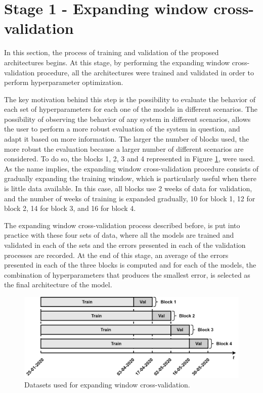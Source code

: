 \section{Stage 1 - Expanding window cross-validation}\label{chap3:section:stage_1}

In this section, the process of training and validation of the proposed architectures begins. At this stage, by performing the expanding window cross-validation procedure, all the architectures were trained and validated in order to perform hyperparameter optimization. 

The key motivation behind this step is the possibility to evaluate the behavior of each set of hyperparameters for each one of the models in different scenarios. The possibility of observing the behavior of any system in different scenarios, allows the user to perform a more robust evaluation of the system in question, and adapt it based on more information. The larger the number of blocks used, the more robust the evaluation because a larger number of different scenarios are considered. To do so, the blocks 1, 2, 3 and 4 represented in Figure \ref{hyptun}, were used. As the name implies, the expanding window cross-validation procedure consists of gradually expanding the training window, which is particularly useful when there is little data available. In this case, all blocks use 2 weeks of data for validation, and the number of weeks of training is expanded gradually, 10 for block 1, 12 for block 2, 14 for block 3, and 16 for block 4.

The expanding window cross-validation process described before, is put into practice with these four sets of data, where all the models are trained and validated in each of the sets and the errors presented in each of the validation processes are recorded. At the end of this stage, an average of the errors presented in each of the three blocks is computed and for each of the models, the combination of hyperparameters that produces the smallest error, is selected as the final architecture of the model. 

\begin{figure}[h!]
    \centering
    \begin{center}
    \includegraphics[width=1\textwidth]{Images/hyptun.png}
    \caption{Datasets used for expanding window cross-validation.}
    \label{hyptun}
    \end{center}
\end{figure}

